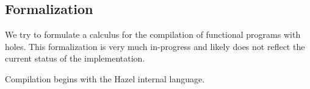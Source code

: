 \documentclass[index.tex]{subfiles}
\begin{document}
\subsection{Formalization}
\label{formalization}
We try to formulate a calculus for the compilation of functional programs with holes. This
formalization is very much in-progress and likely does not reflect the current status of the
implementation.

Compilation begins with the Hazel internal language.
\end{document}
